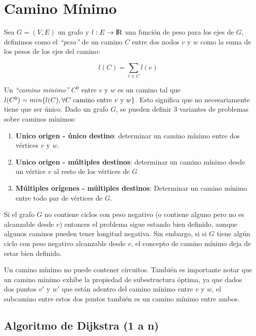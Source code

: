 \newpage
\section{Camino M\'inimo}

Sea $G = (V, E)$ un grafo y $l: E \rightarrow {\rm I\!R}$ una funci\'on de peso para los ejes de $G$, definimos como el \emph{``peso''} de un camino $C$ entre dos nodos $v$ y $w$ como la suma de los pesos de los ejes del camino:

\begin{equation}
l(C) = \sum_{e \in C} l(e)
\end{equation}

Un \emph{``camino minimo''} $C^0$ entre $v$ y $w$ es un camino tal que $l(C^0) = min \{ l(C), \forall \textrm{$ C$ camino entre $v$ y $w$}  \}$. Esto significa que no necesariamente tiene que ser \'unico. Dado un grafo $G$, se pueden definir 3 variantes de problemas sobre caminos m\'inimos:

\begin{enumerate}
\item \textbf{Unico origen - \'unico destino}: determinar un camino m\'inimo entre dos v\'ertices $v$ y $w$.
\item \textbf{Unico origen - m\'ultiples destinos}: determinar un camino m\'inimo desde un v\'ertice $v$ al resto de los v\'ertices de $G$
\item \textbf{M\'ultiples or\'igenes - m\'ultiples destinos}: Determinar un camino m\'inimo entre todo par de v\'ertices de $G$.
\end{enumerate}

Si el grafo $G$ no contiene ciclos con peso negativo (o contiene alguno pero no es alcanzable desde $v$) entonces el problema sigue estando bien definido, aunque algunos caminos pueden tener longitud negativa. Sin embargo, si si $G$ tiene alg\'un ciclo con peso negativo alcanzable desde $v$, el concepto de camino m\'inimo deja de estar bien definido.

Un camino m\'inimo no puede contener circuitos. Tambi\'en es importante notar que un camino m\'inimo exhibe la propiedad de subestructura \'optima, ya que dados dos puntos $v'$ y $w'$ que est\'an adentro del camino m\'inimo entre $v$ y $w$, el subcamino entre estos dos puntos tambi\'en es un camino m\'inimo entre ambos.

\newpage
\subsection{Algoritmo de Dijkstra (1 a n)}

